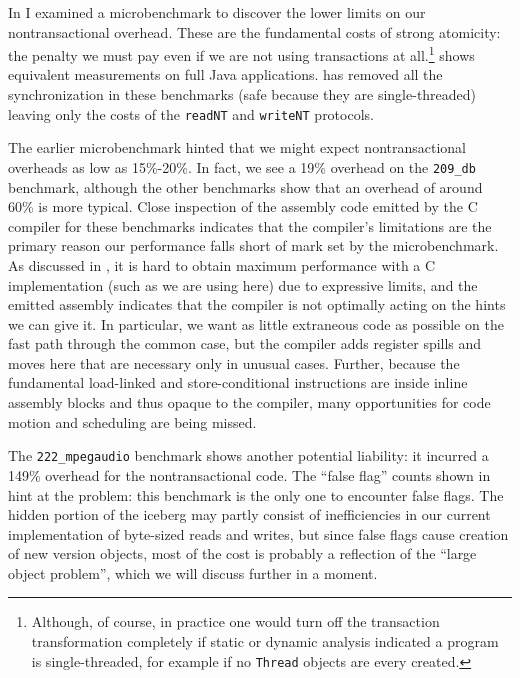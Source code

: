 
In  I examined a microbenchmark to discover the
lower limits on our nontransactional overhead.  These are the
fundamental costs of strong atomicity: the penalty we must pay even if
we are not using transactions at all.\footnote{Although, of course, in
  practice one would turn off the transaction transformation
  completely if static or dynamic analysis indicated a program is
  single-threaded, for example if no \texttt{Thread} objects are every
  created.}   shows equivalent measurements on
full Java applications.  \Flex has removed all the synchronization in
these benchmarks (safe because they are single-threaded) leaving only
the costs of the \texttt{readNT} and \texttt{writeNT} protocols.

The earlier microbenchmark hinted that we might expect
nontransactional overheads as low as 15\%-20\%.
In fact, we see a 19\%
overhead on the \texttt{209\_db} benchmark, although the other
benchmarks show that an overhead of around 60\% is more typical.
Close inspection of the assembly code emitted by the C compiler for
these benchmarks indicates that the compiler's limitations are
the primary reason our performance falls short of mark set by the
microbenchmark.   As discussed in , it is hard to
obtain maximum performance with a C implementation (such as we are
using here) due to expressive limits, and the emitted assembly
indicates that the compiler is not optimally acting on the hints we
can give it.  In particular, we want as little extraneous code as
possible on the fast path through the common case, but the compiler
adds register spills and moves here that are necessary only in
unusual cases.  Further, because the fundamental load-linked and
store-conditional instructions are inside inline assembly blocks and
thus opaque to the compiler, many opportunities for code motion and
scheduling are being missed.

The \texttt{222\_mpegaudio} benchmark shows another potential
liability: it incurred a 149\% overhead for the nontransactional
code.  The ``false flag'' counts shown in  hint at
the problem: this benchmark is the only one to encounter false
flags.  The hidden portion of the iceberg may partly consist of
inefficiencies in our current implementation of byte-sized reads and
writes, but since false flags cause creation of new version objects,
most of the cost is probably a reflection of the ``large object
problem'', which we will discuss further in a moment.

